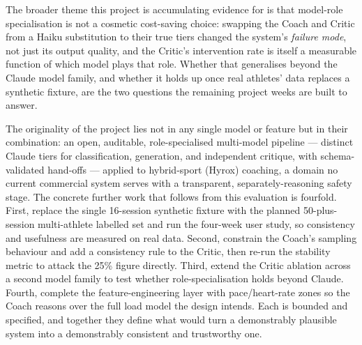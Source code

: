 The broader theme this project is accumulating evidence for is that model-role specialisation is not a cosmetic cost-saving choice: swapping the Coach and Critic from a Haiku substitution to their true tiers changed the system's \emph{failure mode}, not just its output quality, and the Critic's intervention rate is itself a measurable function of which model plays that role. Whether that generalises beyond the Claude model family, and whether it holds up once real athletes' data replaces a synthetic fixture, are the two questions the remaining project weeks are built to answer.

The originality of the project lies not in any single model or feature but in their combination: an open, auditable, role-specialised multi-model pipeline --- distinct Claude tiers for classification, generation, and independent critique, with schema-validated hand-offs --- applied to hybrid-sport (Hyrox) coaching, a domain no current commercial system serves with a transparent, separately-reasoning safety stage. The concrete further work that follows from this evaluation is fourfold. First, replace the single 16-session synthetic fixture with the planned 50-plus-session multi-athlete labelled set and run the four-week user study, so consistency and usefulness are measured on real data. Second, constrain the Coach's sampling behaviour and add a consistency rule to the Critic, then re-run the stability metric to attack the 25\% figure directly. Third, extend the Critic ablation across a second model family to test whether role-specialisation holds beyond Claude. Fourth, complete the feature-engineering layer with pace/heart-rate zones so the Coach reasons over the full load model the design intends. Each is bounded and specified, and together they define what would turn a demonstrably plausible system into a demonstrably consistent and trustworthy one.

